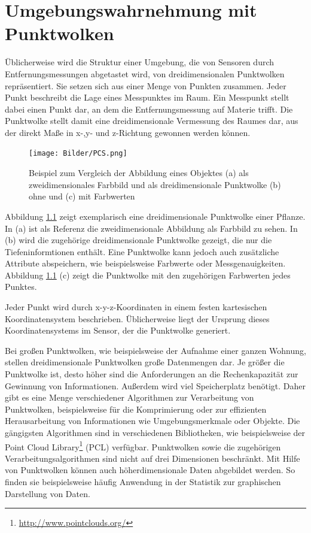 \chapter[Umgebungswahrnehmung mit Punktwolken (Kopp)]{Umgebungswahrnehmung mit Punktwolken}

Üblicherweise wird die Struktur einer Umgebung, die von Sensoren durch Ent\-fern\-ungs\-mess\-ung\-en abgetastet wird, von dreidimensionalen Punktwolken repräsentiert. Sie setzen sich aus einer Menge von Punkten zusammen. Jeder Punkt beschreibt die Lage eines Messpunktes im Raum. Ein Messpunkt stellt dabei einen Punkt dar, an dem die Entfernungsmessung auf Materie trifft. Die Punktwolke stellt damit eine dreidimensionale Vermessung des Raumes dar, aus der direkt Maße in x-,y- und z-Richtung gewonnen werden können. 

\begin{figure}
    \centering
    \texttt{[image: Bilder/PCS.png]}
    \caption{Beispiel zum Vergleich der Abbildung eines Objektes (a) als zweidimensionales Farbbild und als dreidimensionale Punktwolke (b) ohne und (c) mit Farbwerten}
    \label{fig:pc}
\end{figure}

Abbildung \ref{fig:pc} zeigt exemplarisch eine dreidimensionale Punktwolke einer Pflanze. In (a) ist als Referenz die zweidimensionale Abbildung als Farbbild zu sehen. In (b) wird die zugehörige dreidimensionale Punktwolke gezeigt, die nur die Tiefeninformtionen enthält. Eine Punktwolke kann jedoch auch zusätzliche Attribute abspeichern, wie beispielsweise Farbwerte oder Messgenauigkeiten. Abbildung \ref{fig:pc} (c) zeigt die Punktwolke mit den zugehörigen Farbwerten jedes Punktes. 

Jeder Punkt wird durch x-y-z-Koordinaten in einem festen kartesischen Koordinatensystem beschrieben. Üblicherweise liegt der Ursprung dieses Koordinatensystems im Sensor, der die Punktwolke generiert. 

Bei großen Punktwolken, wie beispielsweise der Aufnahme einer ganzen Wohnung, stellen dreidimensionale Punktwolken große Datenmengen dar. Je größer die Punktwolke ist, desto höher sind die Anforderungen an die Rechenkapazität zur Gewinnung von Informationen. Außerdem wird viel Speicherplatz benötigt. Daher gibt es eine Menge verschiedener Algorithmen zur Verarbeitung von Punktwolken, beispielsweise für die Komprimierung oder zur effizienten Herausarbeitung von Informationen wie Um\-ge\-bungs\-merk\-male oder Objekte. Die gängigsten Algorithmen sind in verschiedenen Bibliotheken, wie beispielsweise der Point Cloud Library\footnote{\url{http://www.pointclouds.org/}} (PCL) verfügbar. Punktwolken sowie die zugehörigen Verarbeitungsalgorithmen sind nicht auf drei Dimensionen beschränkt. Mit Hilfe von Punktwolken können auch höherdimensionale Daten abgebildet werden. So finden sie beispielsweise häufig Anwendung in der Statistik zur graphischen Darstellung von Daten. 

